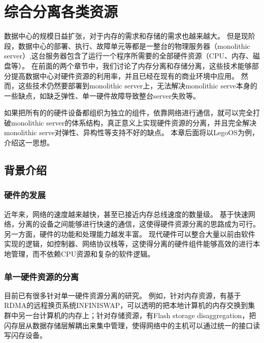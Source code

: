 
\chapter{综合分离各类资源} %

\label{Chapter4} %

数据中心的规模日益扩张，对于内存的需求和存储的需求也越来越大。
但是现阶段，数据中心的部署、执行、故障单元等都是一整台的物理服务器（monolithic server）,这台服务器包含了运行一个程序所需要的全部硬件资源（CPU、内存、磁盘等）。
在前面的两个章节中，我们讨论了内存分离和存储分离，这些技术能够部分提高数据中心对硬件资源的利用率，并且已经在现有的商业环境中应用。
然而，这些技术仍然要部署到monolithic server上，无法解决monolithic serve本身的一些缺点，如缺乏弹性、单一硬件故障导致整台server失败等。

如果把所有的的硬件设备都组织为独立的组件，依靠网络进行通信，就可以完全打破monolithic server的体系结构，真正意义上实现硬件资源的分离，并且完全解决monolithic serve对弹性、异构性等支持不好的缺点。
本章后面将以LegoOS为例，介绍这一思想。


\section{背景介绍}

\subsection{硬件的发展}

近年来，网络的速度越来越快，甚至已接近内存总线速度的数量级。
基于快速网络，分离的设备之间能够进行快速的通信，这使得硬件资源分离的思路成为可行。
另一方面，硬件的功能和处理能力越发丰富。
现代硬件可以整合大量以前由软件实现的逻辑，如控制器、网络协议栈等，这使得分离的硬件组件能够高效的进行本地管理，而不依赖CPU资源和复杂的软件逻辑。

\subsection{单一硬件资源的分离}

目前已有很多针对单一硬件资源分离的研究。
例如，针对内存资源，有基于RDMA的远程换页系统INFINISWAP\parencite{gu2017efficient}，可以透明的把本地计算机的内存交换到集群中另一台计算机的内存上；针对存储资源，有Flash storage disaggregation\parencite{klimovic2016flash}，把闪存层从数据存储层解耦出来集中管理，使得网络中的主机可以通过统一的接口读写闪存设备。

